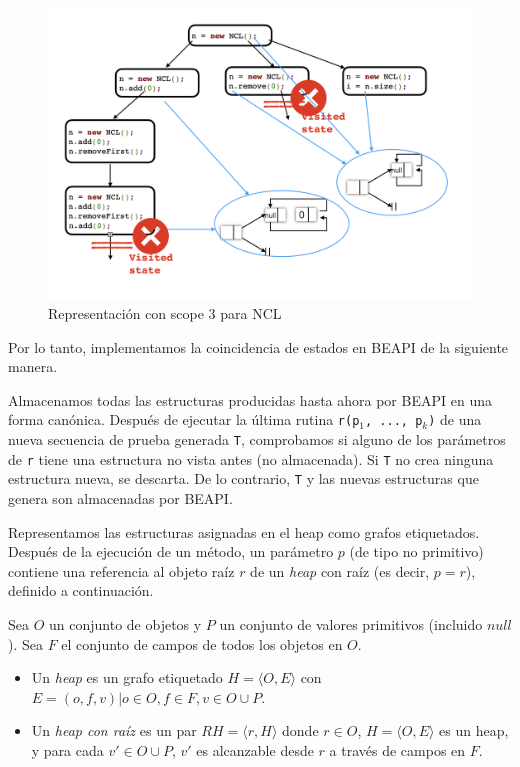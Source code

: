 \begin{figure}[H]
  \centering
  \includegraphics[width=1\textwidth]{images/stateMatching1.jpg}
  \caption{Representación con scope 3 para NCL}
  \label{fig:stateMatching}
\end{figure}

Por lo tanto, implementamos la coincidencia de estados en \textsf{BEAPI} de la siguiente manera.

Almacenamos todas las estructuras producidas hasta ahora por \textsf{BEAPI} en una forma canónica. Después de ejecutar la última rutina \texttt{r(p$_1$, ..., p$_k$)} de una nueva secuencia de prueba generada \texttt{T}, comprobamos si alguno de los parámetros de \texttt{r} tiene una estructura no vista antes (no almacenada). Si \texttt{T} no crea ninguna estructura nueva, se descarta. De lo contrario, \texttt{T} y las nuevas estructuras que genera son almacenadas por \textsf{BEAPI}.

Representamos las estructuras asignadas en el heap como grafos etiquetados. Después de la ejecución de un método, un parámetro $p$ (de tipo no primitivo) contiene una referencia al objeto raíz $r$ de un \emph{heap} con raíz (es decir, $p=r$), definido a continuación.

\begin{definition}
Sea $O$ un conjunto de objetos y $P$ un conjunto de valores primitivos (incluido $null$). Sea $F$ el conjunto de campos de todos los objetos en $O$.
\begin{itemize}
\item Un \emph{heap} es un grafo etiquetado $H = \langle O, E\rangle$ con $E = {(o, f, v) | o \in O, f \in F, v \in O \cup P}$.
\item Un \emph{heap con raíz} es un par $RH = \langle r, H \rangle$ donde $r \in O$, $H = \langle O, E\rangle$ es un heap, y para cada $v' \in O \cup P$, $v'$ es alcanzable desde $r$ a través de campos en $F$.
\end{itemize}
\end{definition}

